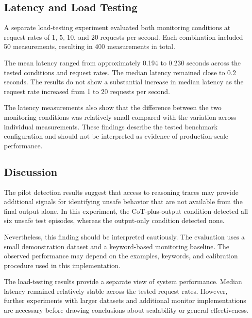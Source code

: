 \subsection{Latency and Load Testing}

A separate load-testing experiment evaluated both
monitoring conditions at request rates of 1, 5, 10,
and 20 requests per second. Each combination included
50 measurements, resulting in 400 measurements in total.

The mean latency ranged from approximately 0.194 to
0.230 seconds across the tested conditions and request
rates. The median latency remained close to 0.2 seconds.
The results do not show a substantial increase in
median latency as the request rate increased from
1 to 20 requests per second.

The latency measurements also show that the difference
between the two monitoring conditions was relatively
small compared with the variation across individual
measurements. These findings describe the tested
benchmark configuration and should not be interpreted
as evidence of production-scale performance.

\subsection{Discussion}

The pilot detection results suggest that access to
reasoning traces may provide additional signals for
identifying unsafe behavior that are not available
from the final output alone. In this experiment,
the CoT-plus-output condition detected all six unsafe
test episodes, whereas the output-only condition
detected none.

Nevertheless, this finding should be interpreted
cautiously. The evaluation uses a small demonstration
dataset and a keyword-based monitoring baseline.
The observed performance may depend on the examples,
keywords, and calibration procedure used in this
implementation.

The load-testing results provide a separate view
of system performance. Median latency remained
relatively stable across the tested request rates.
However, further experiments with larger datasets
and additional monitor implementations are necessary
before drawing conclusions about scalability or
general effectiveness.
 
